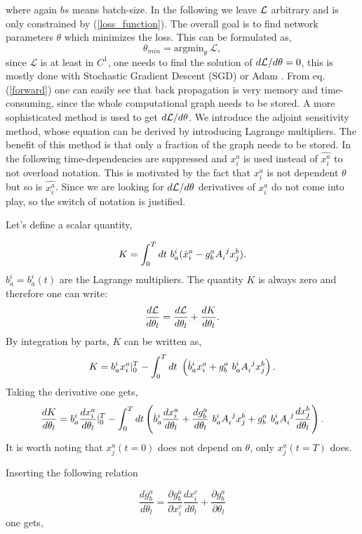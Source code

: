 \documentclass[12pt,a4paper]{article}
\begin{document}
where again $bs$ means batch-size. In the following we leave $\mathcal{L}$ arbitrary and is only constrained by (\ref{loss_function}).
The overall goal is to find network parameters $\theta$ which minimizes the loss. This can be formulated as,
\begin{equation}
\theta_{min} = \text{argmin}_\theta \ \mathcal{L},
\end{equation}
since $\mathcal{L}$ is at least in $C^1$, one needs to find the solution of 
${d\mathcal{L}}/{d\theta} = 0$, this is mostly done with Stochastic Gradient Descent (SGD) or Adam \cite{ADAM}. 
From eq. (\ref{forward}) one can easily see that back propagation is very memory and time-consuming, since the whole computational graph needs to be stored. A more sophisticated method is used to get ${d \mathcal{L}}/{d\theta}$.
We introduce the adjoint sensitivity method, whose equation can be derived by introducing Lagrange multipliers. The benefit of this method is that only a fraction of the graph needs to be stored. In the following time-dependencies are suppressed and $x^a_i$ is used instead of $\hat{x^a_i}$ to not overload notation. This is motivated by the fact that $x^a_i$ is not dependent $\theta$ but so is $\hat{x^a_i}$. Since we are looking for ${d \mathcal{L}}/{d\theta}$ derivatives of $x^a_i$ do not come into play, so the switch of notation is justified.

Let's define a scalar quantity,

\begin{equation}
K = \int^{T}_0 dt\ b^i_a (\dot{x}^a_i - g^a_b A_i^{\ j} x_j^b).
\end{equation}
$b^i_a = b^i_a(t)$ are the Lagrange multipliers. The quantity $K$ is always zero and therefore one can write:
\begin{equation}
\label{dl}
\frac{d\mathcal{L}}{d\theta_l} = \frac{d\mathcal{L}}{d\theta_l}  + \frac{d K}{d\theta_l}.
\end{equation}
By integration by parts, $K$ can be written as,
$$
K = b^i_a x^a_i |^T_{0} - \int^T_0 dt\ \left( \dot{b}^i_a x^a_i + g^a_b \ b^i_a A_i^{\ j} x^b_j \right) .
$$
Taking the derivative one gets,
$$
\frac{d K }{d\theta_l} = b^i_a \frac{dx^a_i}{d\theta_l} |^T_0 - \int^T_0  dt \left( \dot{b}^i_a \frac{dx^a_i}{d\theta_l} + \frac{dg^a_b}{d\theta_l} \ b^i_a A_i^{\ j} x^b_j + g^a_b \ b^i_a A_i^{\ j} \frac{dx^b_j}{d\theta_l}\right).
$$
It is worth noting that $x^a_j(t=0)$ does not depend on $\theta$, only $x^a_j(t=T)$ does.

Inserting the following relation

\begin{equation}
\label{dg}
\frac{dg^a_b}{d\theta_l} = \frac{\partial g^a_b}{\partial x^c_i} \frac{d x^c_i}{d\theta_l} + \frac{\partial g^a_b}{\partial \theta_l}
\end{equation} one gets,
\end{document}

